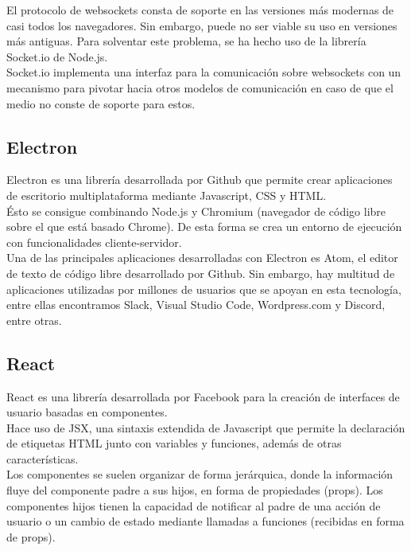 El protocolo de websockets consta de soporte en las versiones más modernas de casi todos los navegadores. Sin embargo, puede no ser viable su uso en versiones más antiguas. Para solventar este problema, se ha hecho uso de la librería Socket.io de Node.js. \\

Socket.io implementa una interfaz para la comunicación sobre websockets con un mecanismo para pivotar hacia otros modelos de comunicación en caso de que el medio no conste de soporte para estos. \\
\subsection {Electron}

Electron es una librería desarrollada por Github que permite crear aplicaciones de escritorio multiplataforma mediante Javascript, CSS y HTML. \\
Ésto se consigue combinando Node.js y Chromium (navegador de código libre sobre el que está basado Chrome). De esta forma se crea un entorno de ejecución con funcionalidades cliente-servidor. \\

Una de las principales aplicaciones desarrolladas con Electron es Atom, el editor de texto de código libre desarrollado por Github. Sin embargo, hay multitud de aplicaciones utilizadas por millones de usuarios que se apoyan en esta tecnología, entre ellas encontramos Slack, Visual Studio Code, Wordpress.com y Discord, entre otras. \\

\subsection {React}

React es una librería desarrollada por Facebook para la creación de interfaces de usuario basadas en componentes. \\

Hace uso de JSX, una sintaxis extendida de Javascript que permite la declaración de etiquetas HTML junto con variables y funciones, además de otras características. \\

Los componentes se suelen organizar de forma jerárquica, donde la información fluye del componente padre a sus hijos, en forma de propiedades (props). Los componentes hijos tienen la capacidad de notificar al padre de una acción de usuario o un cambio de estado mediante llamadas a funciones (recibidas en forma de props).\\

